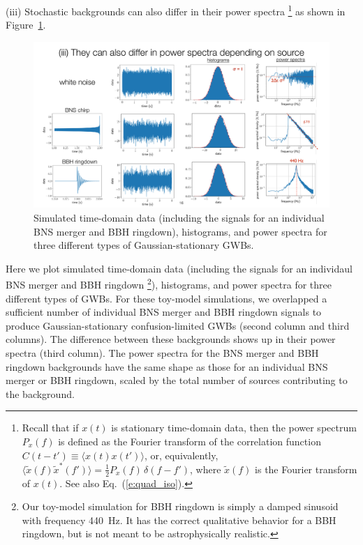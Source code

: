 (iii) Stochastic backgrounds can also differ in their power 
spectra%
\footnote{Recall that if $x(t)$ is stationary time-domain data, 
then the power spectrum $P_x(f)$ is defined as the Fourier 
transform of the correlation function 
$C(t-t') \equiv \langle x(t)x(t')\rangle$, or,
equivalently, $\langle \tilde x(f)\tilde x^*(f')\rangle =
\frac{1}{2}P_x(f)\,\delta(f-f')$, where $\tilde x(f)$ is the Fourier
transform of $x(t)$.
See also Eq.~(\ref{e:quad_iso}).}
as shown in Figure~\ref{f:different_power_spectra}.
%
\begin{figure}[htbp!]
\begin{center}
\includegraphics[width=\textwidth]{Figures/different_power_spectra}
\caption{Simulated time-domain data (including the signals for an
individual BNS merger and BBH ringdown), histograms, and power spectra
for three different types of Gaussian-stationary GWBs.}
\label{f:different_power_spectra}
\end{center}
\end{figure}
%
Here we plot simulated time-domain data (including the signals for an
individaul BNS merger and BBH ringdown%
\footnote{Our toy-model simulation for BBH ringdown is simply a 
damped sinusoid with frequency 440~Hz.
It has the correct qualitative behavior for a BBH ringdown, but 
is not meant to be astrophysically realistic.}), 
histograms, and power spectra
for three different types of GWBs.
For these toy-model simulations, we overlapped a sufficient number of 
individual BNS merger and BBH ringdown signals to produce 
Gaussian-stationary confusion-limited GWBs
(second column and third columns).
The difference between these backgrounds shows up in their power 
spectra (third column).
The power spectra for the BNS merger and BBH ringdown backgrounds 
have the same shape as those for an individual BNS merger or 
BBH ringdown, scaled by the total number of sources contributing 
to the background.

